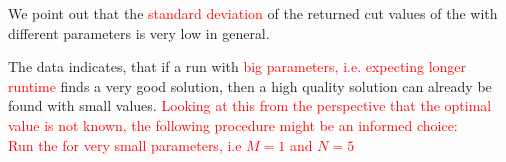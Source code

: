 \documentclass[12pt,a4paper]{article}
\theoremstyle{mythm}
\begin{document}
We point out that the \textcolor{red}{standard deviation} of the returned cut values of the \BH with different parameters is very low in general.

The data indicates, that if a run with \textcolor{red}{big parameters, i.e. expecting longer runtime} finds a very good solution, then a high quality solution can already be
found with small values.
\textcolor{red}{
Looking at this from the perspective that the optimal value is not known, the following procedure might be an informed choice: \\
Run the \BH for very small parameters, i.e $ M = 1 $ and $ N = 5 $
}


\listoftodos[Notes]
\end{document}
